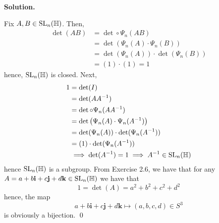 \documentclass[12pt]{book}
\theoremstyle{definition}
\newenvironment{solution}
{%
  \par\noindent\textbf{Solution.}\quad
}
{%
  \qed\par
}
\begin{document}
\begin{solution}
  Fix $A, B \in \mathrm{SL}_{n}(\mathbb{H})$.
  Then,
  \[
  \begin{aligned}
    \det(AB) &= \det \circ \Psi_n(AB) \\
             &= \det \left(\Psi_n(A) \cdot \Psi_n(B) \right) \\
             &= \det(\Psi_n(A)) \cdot \det(\Psi_n(B)) \\
             &= (1) \cdot (1) = 1
  \end{aligned}
  \]    
  hence, $\mathrm{SL}_{n}(\mathbb{H})$ is closed. 
  Next, 
  \[\begin{aligned}
    1 &= \det(I) \\
      &= \det(AA^{-1}) \\
      &= \det \circ \Psi_n(AA^{-1}) \\
      &= \det \left(\Psi_n(A) \cdot \Psi_n(A^{-1}) \right) \\
      &= \det(\Psi_n(A)) \cdot \det(\Psi_n(A^{-1})) \\
      &= (1) \cdot \det(\Psi_n(A^{-1})) \\
      &\implies \det(A^{-1}) = 1 \implies A^{-1} \in \mathrm{SL}_{n}(\mathbb{H})
  \end{aligned}\]
  hence $\mathrm{SL}_{n}(\mathbb{H})$ is a subgroup.
  From Exercise 2.6, we have that for any $A = a +b\mathbf{i} + c\mathbf{j} + d\mathbf{k} \in \mathrm{SL}_{n}(\mathbb{H})$ we have that 
  \[1 = \det(A) = a^2 + b^2 + c^2 + d^2\]
  hence, the map 
  \[a + b\mathbf{i} + c\mathbf{j} + d\mathbf{k} \mapsto (a, b, c, d) \in S^3\]
  is obviously a bijection.
\end{solution}

\begin{taggedexercise}[\textcolor{red}{TODO}]
  
\end{taggedexercise}

\begin{taggedexercise}[\textcolor{red}{TODO}]
  
\end{taggedexercise}

\begin{taggedexercise}[\textcolor{red}{TODO}]
  
\end{taggedexercise}

\begin{taggedexercise}[\textcolor{red}{TODO}]
  
\end{taggedexercise}
\end{document}
